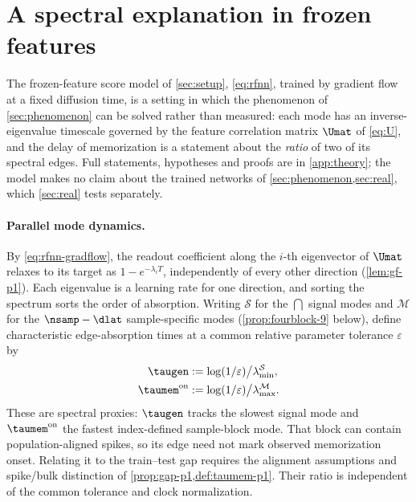 \section{A spectral explanation in frozen features}
\label{sec:theory}\label{sec:rfnn}

The frozen-feature score model of \cref{sec:setup}, \eqref{eq:rfnn}, trained by gradient flow at a fixed diffusion time, is a setting in which the phenomenon of \cref{sec:phenomenon} can be solved rather than measured: each mode has an inverse-eigenvalue timescale governed by the feature correlation matrix $\Umat$ of \eqref{eq:U}, and the delay of memorization is a statement about the \emph{ratio} of two of its spectral edges. Full statements, hypotheses and proofs are in \cref{app:theory}; the model makes no claim about the trained networks of \cref{sec:phenomenon,sec:real}, which \cref{sec:real} tests separately.

\paragraph{Parallel mode dynamics.}\label{sec:theory-setup}
By \eqref{eq:rfnn-gradflow}, the readout coefficient along the $i$-th eigenvector of $\Umat$ relaxes to its target as $1-e^{-\lambda_iT}$, independently of every other direction (\cref{lem:gf-p1}). Each eigenvalue is a learning rate for one direction, and sorting the spectrum sorts the order of absorption. Writing $\mathcal S$ for the $\dint$ signal modes and $\mathcal M$ for the $\nsamp-\dlat$ sample-specific modes (\cref{prop:fourblock-9} below), define characteristic edge-absorption times at a common relative parameter tolerance $\varepsilon$ by
\begin{align}
\taugen&:=\log(1/\varepsilon)\big/\lambda^{\mathcal S}_{\min},\label{def:taugen-main}\\
\taumem^{\rm on}&:=\log(1/\varepsilon)\big/\lambda^{\mathcal M}_{\max}.\label{def:taumem-main}
\end{align}
These are spectral proxies: $\taugen$ tracks the slowest signal mode and $\taumem^{\rm on}$ the fastest index-defined sample-block mode. That block can contain population-aligned spikes, so its edge need not mark observed memorization onset. Relating it to the train--test gap requires the alignment assumptions and spike/bulk distinction of \cref{prop:gap-p1,def:taumem-p1}. Their ratio is independent of the common tolerance and clock normalization.

